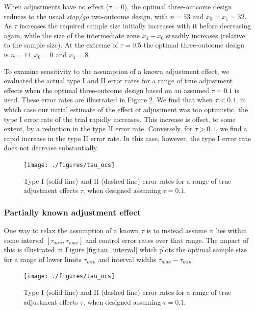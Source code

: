 \documentclass{bmcart}
\begin{document}
When adjustments have no effect ($\tau = 0$), the optimal three-outcome design reduces to the usual \emph{stop/go} two-outcome design, with $n = 53$ and $x_0 = x_1 = 32$. As $\tau$ increases the required sample size initially increases with it before decreasing again, while the size of the intermediate zone $x_1 - x_0$ steadily increases (relative to the sample size). At the extreme of $\tau = 0.5$ the optimal three-outcome design is $n= 11, x_0 = 0$ and $x_1 = 8$.

To examine sensitivity to the assumption of a known adjustment effect, we evaluated the actual type I and II error rates for a range of true adjustment effects when the optimal three-outcome design based on an assumed $\tau = 0.1$ is used. These error rates are illustrated in Figure \ref{fig:tau_ocs}. We find that when $\tau < 0.1$, in which case our initial estimate of the effect of adjustment was too optimistic, the type I error rate of the trial rapidly increases. This increase is offset, to some extent, by a reduction in the type II error rate. Conversely, for $\tau > 0.1$, we find a rapid increase in the type II error rate. In this case, however, the type I error rate does not decrease substantially. 

\begin{figure}
\centering
\texttt{[image: ./figures/tau\_ocs]}
\caption{Type I (solid line) and II (dashed line) error rates for a range of true adjustment effects $\tau$, when designed assuming $\tau = 0.1$.}
\label{fig:tau_ocs}
\end{figure}

\subsubsection{Partially known adjustment effect}

One way to relax the assumption of a known $\tau$ is to instead assume it lies within some interval $[\tau_{min}, \tau_{max}]$ and control error rates over that range. The impact of this is illustrated in Figure \ref{fig:tau_interval} which plots the optimal sample size for a range of lower limits $\tau_{min}$ and interval widths $\tau_{max} - \tau_{min}$.

\begin{figure}
\centering
\texttt{[image: ./figures/tau\_ocs]}
\caption{Type I (solid line) and II (dashed line) error rates for a range of true adjustment effects $\tau$, when designed assuming $\tau = 0.1$.}
\label{fig:tau_ocs}
\end{figure}
\end{document}
